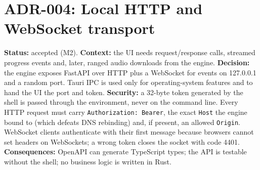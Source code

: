 \section{ADR-004: Local HTTP and WebSocket transport}
\textbf{Status:} accepted (M2). \textbf{Context:} the UI needs request/response
calls, streamed progress events and, later, ranged audio downloads from the
engine. \textbf{Decision:} the engine exposes FastAPI over HTTP plus a
WebSocket for events on 127.0.0.1 and a random port. Tauri IPC is used only for
operating-system features and to hand the UI the port and token.
\textbf{Security:} a 32-byte token generated by the shell is passed through the
environment, never on the command line. Every HTTP request must carry
\texttt{Authorization: Bearer}, the exact \texttt{Host} the engine bound to (which
defeats DNS rebinding) and, if present, an allowed \texttt{Origin}. WebSocket
clients authenticate with their first message because browsers cannot set
headers on WebSockets; a wrong token closes the socket with code 4401.
\textbf{Consequences:} OpenAPI can generate TypeScript types; the API is
testable without the shell; no business logic is written in Rust.
